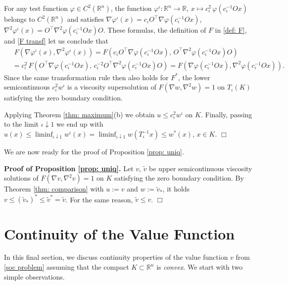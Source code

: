 \documentclass[11pt]{amsart}
\numberwithin{equation}{section}
\newcommand{\rr}{\mathbb{R}}
\newcommand{\ep}{\hfill $\Box$}
\begin{document}
For any test function $\varphi\in C^2(\rr^n)$, the function $\varphi^\iota\!:\rr^n\to\rr$, $x\mapsto c_\iota^2\,\varphi(c_\iota^{-1}Ox)$ belongs to $C^2(\rr^n)$ and satisfies $\nabla\varphi^\iota(x)=c_\iota O^\top\nabla\varphi(c_\iota^{-1}Ox)$, $\nabla^2\varphi^\iota(x)=O^\top\nabla^2\varphi(c_\iota^{-1}Ox)O$. These formulas, the definition of $F$ in \eqref{def: F}, and \eqref{F transf} let us conclude that
\begin{equation}
\begin{split}
&\; F(\nabla\varphi^\iota(x),\nabla^2\varphi^\iota(x))
=F(c_\iota O^\top\nabla\varphi(c_\iota^{-1}Ox),\,O^\top\nabla^2\varphi(c_\iota^{-1}Ox)O) \\
& =c_\iota^2\,
F(O^\top\nabla\varphi(c_\iota^{-1}Ox),\,c_\iota^{-2}O^\top\nabla^2\varphi(c_\iota^{-1}Ox)O)
=F(\nabla\varphi(c_\iota^{-1}Ox),\nabla^2\varphi(c_\iota^{-1}Ox)).
\end{split}
\end{equation}
Since the same transformation rule then also holds for $F^*$, the lower semicontinuous $c_\iota^2w^\iota$ is a viscosity supersolution of $F(\nabla w,\nabla^2w)=1$ on $T_\iota(K)$ satisfying the zero boundary condition.

\medskip

Applying Theorem \ref{thm: maximum}(b) we obtain $u\le c_\iota^2w^\iota$ on $K$. Finally, passing to the limit $\iota\downarrow1$ we end up with $u(x)\le\liminf_{\iota\downarrow1} w^\iota(x)=\liminf_{\iota\downarrow1} w(T_\iota^{-1}x)\le w^*(x)$, $x\in K$. \ep

\medskip

We are now ready for the proof of Proposition \ref{prop: uniq}.

\medskip

\noindent\textbf{Proof of Proposition \ref{prop: uniq}.} Let $v$, $\widetilde{v}$ be upper semicontinuous viscosity solutions of $F(\nabla v,\nabla^2v)=1$ on $K$ satisfying the zero boundary condition. By Theorem \ref{thm: comparison} with $u:=v$ and $w:=\widetilde{v}_*$, it holds $v\le(\widetilde{v}_*)^*\le\widetilde{v}^*=\widetilde{v}$. For the same reason, $\widetilde{v}\le v$. \ep

\section{Continuity of the Value Function} \label{sec5}

In this final section, we discuss continuity properties of the value function $v$ from \eqref{soc problem} assuming that the compact $K\subset\rr^n$ is \textit{convex}. We start with two simple observations. 
\end{document}
